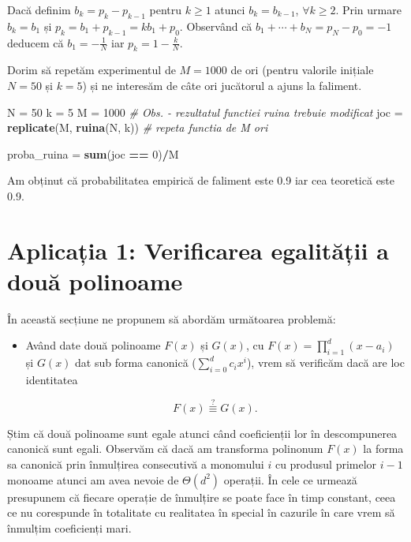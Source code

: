 \documentclass[]{article}
\newenvironment{Shaded}{\begin{snugshade}}{\end{snugshade}}
\newcommand{\CommentTok}[1]{\textcolor[rgb]{0.56,0.35,0.01}{\textit{#1}}}
\newcommand{\DecValTok}[1]{\textcolor[rgb]{0.00,0.00,0.81}{#1}}
\newcommand{\KeywordTok}[1]{\textcolor[rgb]{0.13,0.29,0.53}{\textbf{#1}}}
\newcommand{\NormalTok}[1]{#1}
\newcommand{\OperatorTok}[1]{\textcolor[rgb]{0.81,0.36,0.00}{\textbf{#1}}}
\newcommand{\StringTok}[1]{\textcolor[rgb]{0.31,0.60,0.02}{#1}}
\newenvironment{frshaded*}{%
  \def\FrameCommand{\fboxrule=\FrameRule\fboxsep=\FrameSep \fcolorbox{framecolor}{shadecolor1}}%
  \MakeFramed {\advance\hsize-\width \FrameRestore}}%
{\endMakeFramed}
\newenvironment{rmdblock}[1]
  {\begin{frshaded*}
  \begin{itemize}
  \renewcommand{\labelitemi}{
    \raisebox{-.7\height}[0pt][0pt]{
      {\setkeys{Gin}{width=2em,keepaspectratio}\texttt{[image: images/icons/\#1]}}
    }
  }
  \item
  }
  {
  \end{itemize}
  \end{frshaded*}
  }
\newenvironment{rmdexercise}
  {\begin{rmdblock}{exercise}}
  {\end{rmdblock}}
\begin{document}
Dacă definim \(b_k = p_k - p_{k-1}\) pentru \(k\geq 1\) atunci
\(b_k = b_{k-1}\), \(\forall k\geq2\). Prin urmare \(b_k = b_1\) și
\(p_k = b_1+p_{k-1} = kb_1+p_0\). Observând că
\(b_1+\cdots+b_N=p_N-p_0=-1\) deducem că \(b_1=-\frac{1}{N}\) iar
\(p_k=1-\frac{k}{N}\).

Dorim să repetăm experimentul de \(M = 1000\) de ori (pentru valorile
inițiale \(N = 50\) și \(k = 5\)) și ne interesăm de câte ori jucătorul
a ajuns la faliment.

\begin{Shaded}
\begin{Highlighting}[]
\NormalTok{N =}\StringTok{ }\DecValTok{50}
\NormalTok{k =}\StringTok{ }\DecValTok{5}
\NormalTok{M =}\StringTok{ }\DecValTok{1000}
\CommentTok{# Obs. - rezultatul functiei ruina trebuie modificat}
\NormalTok{joc =}\StringTok{ }\KeywordTok{replicate}\NormalTok{(M, }\KeywordTok{ruina}\NormalTok{(N, k)) }\CommentTok{# repeta functia de M ori }

\NormalTok{proba_ruina =}\StringTok{ }\KeywordTok{sum}\NormalTok{(joc }\OperatorTok{==}\StringTok{ }\DecValTok{0}\NormalTok{)}\OperatorTok{/}\NormalTok{M }
\end{Highlighting}
\end{Shaded}

Am obținut că probabilitatea empirică de faliment este 0.9 iar cea
teoretică este 0.9.

\hypertarget{aplicaux21bia-1-verificarea-egalitux103ux21bii-a-douux103-polinoame}{%
\section{Aplicația 1: Verificarea egalității a două
polinoame}\label{aplicaux21bia-1-verificarea-egalitux103ux21bii-a-douux103-polinoame}}

În această secțiune ne propunem să abordăm următoarea problemă:

\begin{rmdexercise}
Având date două polinoame \(F(x)\) și \(G(x)\), cu
\(F(x)=\prod_{i=1}^d(x-a_i)\) și \(G(x)\) dat sub forma canonică
(\(\sum_{i=0}^d c_ix^i\)), vrem să verificăm dacă are loc identitatea

\[
  F(x) \overset{?}{\equiv} G(x).
\]
\end{rmdexercise}

Știm că două polinoame sunt egale atunci când coeficienții lor în
descompunerea canonică sunt egali. Observăm că dacă am transforma
polinonum \(F(x)\) la forma sa canonică prin înmulțirea consecutivă a
monomului \(i\) cu produsul primelor \(i-1\) monoame atunci am avea
nevoie de \(\Theta(d^2)\) operații. În cele ce urmează presupunem că
fiecare operație de înmulțire se poate face în timp constant, ceea ce nu
corespunde în totalitate cu realitatea în special în cazurile în care
vrem să înmulțim coeficienți mari.
\end{document}
